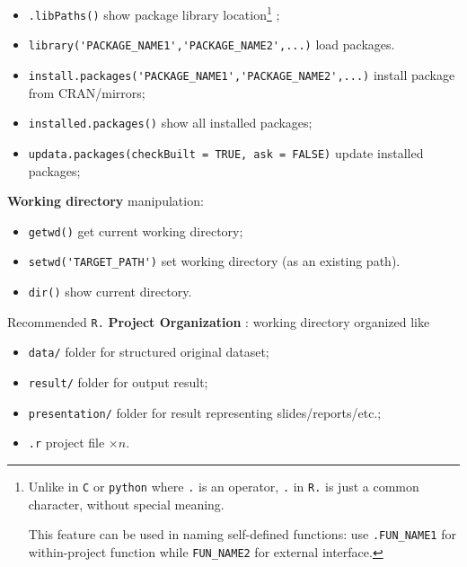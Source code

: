\begin{itemize}[topsep=2pt,itemsep=0pt]
    \item \lstinline|.libPaths()| show package library location\footnote{Unlike in \lstinline|C| or \lstinline|python| where \lstinline|.| is an operator, \lstinline|.| in \lstinline|R.| is just a common character, without special meaning.
    
    This feature can be used in naming self-defined functions: use \lstinline|.FUN_NAME1| for within-project function while \lstinline|FUN_NAME2| for external interface.} ;
    \item \lstinline|library('PACKAGE_NAME1','PACKAGE_NAME2',...)| load packages.
    \item \lstinline|install.packages('PACKAGE_NAME1','PACKAGE_NAME2',...)| install package from CRAN/mirrors;
    \item \lstinline|installed.packages()| show all installed packages;
    \item \lstinline|updata.packages(checkBuilt = TRUE, ask = FALSE)| update installed packages;
\end{itemize}

\begin{point}
    \textbf{Working directory}  manipulation:
\end{point}

\begin{itemize}[topsep=2pt,itemsep=0pt]
    \item \lstinline|getwd()| get current working directory;
    \item \lstinline|setwd('TARGET_PATH')| set working directory (as an existing path).
    \item \lstinline|dir()| show current directory.
\end{itemize}

\begin{point}
    Recommended \lstinline|R.| \textbf{Project Organization} : working directory organized like
\end{point}

\begin{itemize}[topsep=2pt,itemsep=0pt]
    \item \lstinline|data/| folder for structured original dataset;
    \item \lstinline|result/| folder for output result;
    \item \lstinline|presentation/| folder for result representing slides/reports/etc.;
    \item \lstinline|.r| project file $ \times n $.
\end{itemize}

